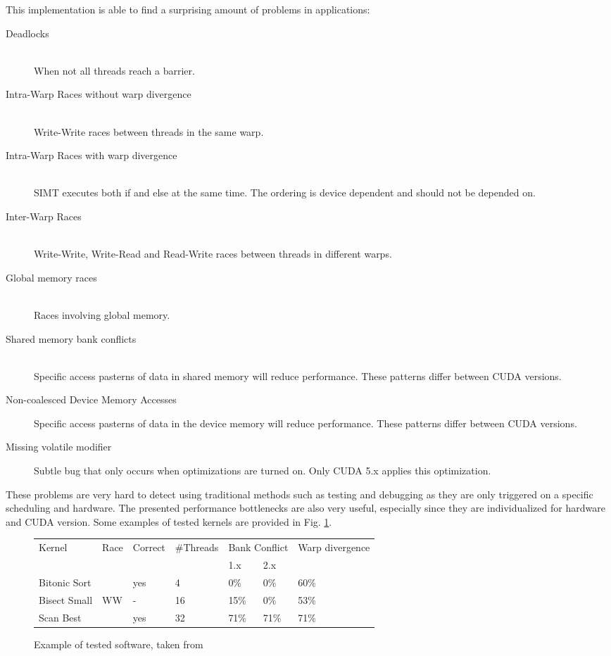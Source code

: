 \documentclass[10pt]{llncs}
\begin{document}
This implementation is able to find a surprising amount of problems in applications:

\begin{description}
	\item[Deadlocks] \hfill \\
		When not all threads reach a barrier.
	\item[Intra-Warp Races without warp divergence]  \hfill \\
		Write-Write races between threads in the same warp.
	\item[Intra-Warp Races with warp divergence] \hfill \\
		SIMT executes both if and else at the same time. The ordering is device dependent and should not be depended on.
	\item[Inter-Warp Races] \hfill \\
		Write-Write, Write-Read and Read-Write races between threads in different warps.
	\item[Global memory races] \hfill \\
		Races involving global memory.
	\item[Shared memory bank conflicts] \hfill \\
		Specific access pasterns of data in shared memory will reduce performance. These patterns differ between CUDA versions.
	\item[Non-coalesced Device Memory Accesses]
		Specific access pasterns of data in the device memory will reduce performance. These patterns differ between CUDA versions.
	\item[Missing volatile modifier]
		Subtle bug that only occurs when optimizations are turned on. Only CUDA 5.x applies this optimization.
\end{description}

These problems are very hard to detect using traditional methods such as testing and debugging as they are only triggered on a specific scheduling and hardware. The presented performance bottlenecks are also very useful, especially since they are individualized for hardware and CUDA version.  Some examples of tested kernels are provided in Fig. \ref{example:7}.

\begin{figure}
	\centering
	
	\begin{tabular}{l l l l l l l}
		Kernel & Race & Correct & \#Threads & \multicolumn{2}{c}{Bank Conflict} & Warp divergence\\
		& & & & 1.x & 2.x & \\
		\hline
		
		Bitonic Sort & & yes & 4 & 0\% & 0\% & 60\% \\
		Bisect Small & WW & - & 16 & 15\% & 0\% & 53\% \\
		Scan Best & & yes & 32 & 71\% & 71\% & 71\%
	\end{tabular}
	
	\caption{Example of tested software, taken from \cite{base7}}
	\label{example:7}
\end{figure}
\end{document}
